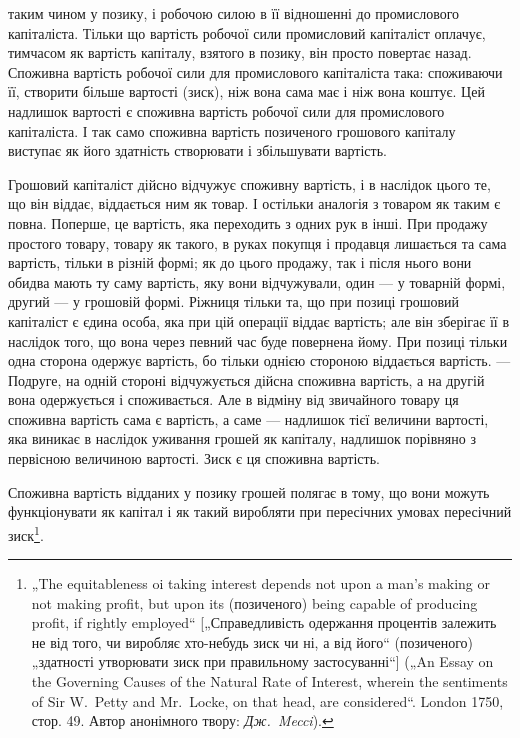 \parcont{}  %
таким чином у позику, і робочою силою в її відношенні до промислового
капіталіста. Тільки що вартість робочої сили промисловий
капіталіст оплачує, тимчасом як вартість капіталу, взятого
в позику, він просто повертає назад. Споживна вартість робочої
сили для промислового капіталіста така: споживаючи її, створити
більше вартості (зиск), ніж вона сама має і ніж вона коштує.
Цей надлишок вартості є споживна вартість робочої сили для
промислового капіталіста. І так само споживна вартість позиченого
грошового капіталу виступає як його здатність створювати
і збільшувати вартість.

Грошовий капіталіст дійсно відчужує споживну вартість, і в наслідок
цього те, що він віддає, віддається ним як товар. І остільки
аналогія з товаром як таким є повна. Поперше, це вартість, яка
переходить з одних рук в інші. При продажу простого товару,
товару як такого, в руках покупця і продавця лишається та сама
вартість, тільки в різній формі; як до цього продажу, так і після
нього вони обидва мають ту саму вартість, яку вони відчужували,
один — у товарній формі, другий — у грошовій формі. Ріжниця
тільки та, що при позиці грошовий капіталіст є єдина особа, яка
при цій операції віддає вартість; але він зберігає її в наслідок того,
що вона через певний час буде повернена йому. При позиці тільки
одна сторона одержує вартість, бо тільки однією стороною віддається
вартість. — Подруге, на одній стороні відчужується дійсна
споживна вартість, а на другій вона одержується і споживається.
Але в відміну від звичайного товару ця споживна вартість сама є
вартість, а саме — надлишок тієї величини вартості, яка виникає
в наслідок уживання грошей як капіталу, надлишок порівняно з
первісною величиною вартості. Зиск є ця споживна вартість.

Споживна вартість відданих у позику грошей полягає в тому,
що вони можуть функціонувати як капітал і як такий виробляти
при пересічних умовах пересічний зиск\footnote{
„The equitableness oi taking interest depends not upon a man’s making or
not making profit, but upon its (позиченого) being capable of producing profit, if
rightly employed“ [„Справедливість одержання процентів залежить не від того, чи
виробляє хто-небудь зиск чи ні, а від його“ (позиченого) „здатності утворювати
зиск при правильному застосуванні“] („An Essay on the Governing Causes of
the Natural Rate of Interest, wherein the sentiments of Sir W.~Petty and
Mr.~Locke, on that head, are considered“. London 1750, стор. 49. Автор анонімного
твору: \emph{Дж.~Mecci}).
}.

